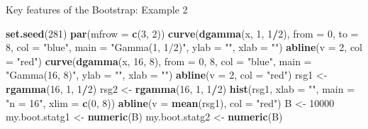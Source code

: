 \documentclass[
  ignorenonframetext,
]{beamer}
\newenvironment{Shaded}{\begin{snugshade}}{\end{snugshade}}
\newcommand{\AttributeTok}[1]{\textcolor[rgb]{0.13,0.29,0.53}{#1}}
\newcommand{\DecValTok}[1]{\textcolor[rgb]{0.00,0.00,0.81}{#1}}
\newcommand{\FunctionTok}[1]{\textcolor[rgb]{0.13,0.29,0.53}{\textbf{#1}}}
\newcommand{\NormalTok}[1]{#1}
\newcommand{\OtherTok}[1]{\textcolor[rgb]{0.56,0.35,0.01}{#1}}
\newcommand{\SpecialCharTok}[1]{\textcolor[rgb]{0.81,0.36,0.00}{\textbf{#1}}}
\newcommand{\StringTok}[1]{\textcolor[rgb]{0.31,0.60,0.02}{#1}}
\begin{document}
\begin{frame}[fragile]{Key features of the Bootstrap: Example 2}
\label{key-features-of-the-bootstrap-example-2-1}
\tiny

\begin{Shaded}
\begin{Highlighting}[]
\FunctionTok{set.seed}\NormalTok{(}\DecValTok{281}\NormalTok{)}
\FunctionTok{par}\NormalTok{(}\AttributeTok{mfrow =} \FunctionTok{c}\NormalTok{(}\DecValTok{3}\NormalTok{, }\DecValTok{2}\NormalTok{))}
\FunctionTok{curve}\NormalTok{(}\FunctionTok{dgamma}\NormalTok{(x, }\DecValTok{1}\NormalTok{, }\DecValTok{1}\SpecialCharTok{/}\DecValTok{2}\NormalTok{), }\AttributeTok{from =} \DecValTok{0}\NormalTok{, }\AttributeTok{to =} \DecValTok{8}\NormalTok{, }\AttributeTok{col =} \StringTok{"blue"}\NormalTok{, }\AttributeTok{main =} \StringTok{"Gamma(1, 1/2)"}\NormalTok{, }\AttributeTok{ylab =} \StringTok{""}\NormalTok{, }\AttributeTok{xlab =} \StringTok{""}\NormalTok{)}
\FunctionTok{abline}\NormalTok{(}\AttributeTok{v =} \DecValTok{2}\NormalTok{, }\AttributeTok{col =} \StringTok{"red"}\NormalTok{)}
\FunctionTok{curve}\NormalTok{(}\FunctionTok{dgamma}\NormalTok{(x, }\DecValTok{16}\NormalTok{, }\DecValTok{8}\NormalTok{), }\AttributeTok{from =} \DecValTok{0}\NormalTok{, }\DecValTok{8}\NormalTok{, }\AttributeTok{col =} \StringTok{"blue"}\NormalTok{, }\AttributeTok{main =} \StringTok{"Gamma(16, 8)"}\NormalTok{, }\AttributeTok{ylab =} \StringTok{""}\NormalTok{, }\AttributeTok{xlab =} \StringTok{""}\NormalTok{)}
\FunctionTok{abline}\NormalTok{(}\AttributeTok{v =} \DecValTok{2}\NormalTok{, }\AttributeTok{col =} \StringTok{"red"}\NormalTok{)}
\NormalTok{rsg1 }\OtherTok{\textless{}{-}} \FunctionTok{rgamma}\NormalTok{(}\DecValTok{16}\NormalTok{, }\DecValTok{1}\NormalTok{, }\DecValTok{1}\SpecialCharTok{/}\DecValTok{2}\NormalTok{)}
\NormalTok{rsg2 }\OtherTok{\textless{}{-}} \FunctionTok{rgamma}\NormalTok{(}\DecValTok{16}\NormalTok{, }\DecValTok{1}\NormalTok{, }\DecValTok{1}\SpecialCharTok{/}\DecValTok{2}\NormalTok{)}
\FunctionTok{hist}\NormalTok{(rsg1, }\AttributeTok{xlab =} \StringTok{""}\NormalTok{, }\AttributeTok{main =} \StringTok{"n = 16"}\NormalTok{, }\AttributeTok{xlim =} \FunctionTok{c}\NormalTok{(}\DecValTok{0}\NormalTok{, }\DecValTok{8}\NormalTok{))}
\FunctionTok{abline}\NormalTok{(}\AttributeTok{v =} \FunctionTok{mean}\NormalTok{(rsg1), }\AttributeTok{col =} \StringTok{"red"}\NormalTok{)}
\NormalTok{B }\OtherTok{\textless{}{-}} \DecValTok{10000}
\NormalTok{my.boot.statg1 }\OtherTok{\textless{}{-}} \FunctionTok{numeric}\NormalTok{(B)}
\NormalTok{my.boot.statg2 }\OtherTok{\textless{}{-}} \FunctionTok{numeric}\NormalTok{(B)}

\end{Highlighting}
\end{Shaded}
\end{frame}
\end{document}
